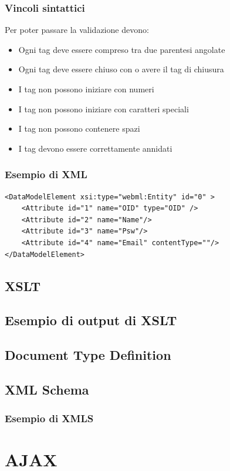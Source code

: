 \documentclass{beamer}
\begin{document}
\begin{frame}
    \frametitle{Vincoli sintattici}
    Per poter passare la validazione devono:
    \begin{itemize}
    \item Ogni tag deve essere compreso tra due parentesi angolate 
    \item Ogni tag deve essere chiuso con \/ o avere il tag di chiusura
    \item I tag non possono iniziare con numeri 
    \item I tag non possono iniziare con caratteri speciali
    \item I tag non possono contenere spazi 
    \item I tag devono essere correttamente annidati 
    \end{itemize}

\end{frame}


\begin{frame}[fragile]
    \frametitle{Esempio di XML}
    \begin{verbatim}
<DataModelElement xsi:type="webml:Entity" id="0" >       
    <Attribute id="1" name="OID" type="OID" /> 
    <Attribute id="2" name="Name"/> 
    <Attribute id="3" name="Psw"/> 
    <Attribute id="4" name="Email" contentType=""/> 
</DataModelElement> 
    \end{verbatim}
\end{frame}

\subsection{XSLT}
\subsection{Esempio di output di XSLT}
\subsection{Document Type Definition}
\subsection{XML Schema}
\subsubsection{Esempio di XMLS}

\section{AJAX}
\end{document}
